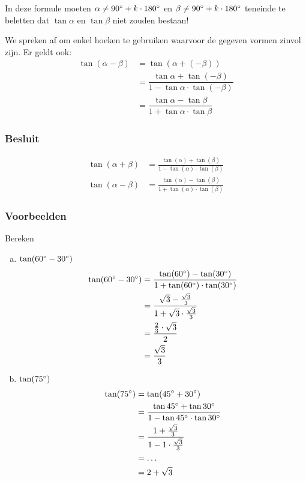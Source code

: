 \documentclass[a4paper,12pt]{article}
\begin{document}
In deze formule moeten $\alpha\neq 90^\circ + k\cdot 180^\circ$ en $\beta \neq 90^\circ + k\cdot 180^\circ$ teneinde te beletten dat $\tan\alpha$ en $\tan\beta$ niet zouden bestaan!

We spreken af om enkel hoeken te gebruiken waarvoor de gegeven vormen zinvol zijn. Er geldt ook:
\begin{align*}
  \tan(\alpha - \beta) &= \tan(\alpha + (-\beta))\\
                       &= \dfrac{\tan\alpha + \tan(-\beta)}{1-\tan\alpha\cdot\tan(-\beta)}\\
                       &= \dfrac{\tan\alpha - \tan\beta}{1+\tan\alpha\cdot\tan\beta}
\end{align*}

\subsubsection*{Besluit}
\begin{align*}
  \tan(\alpha + \beta)&=\frac{\tan(\alpha)+\tan(\beta)}{1-\tan(\alpha)\cdot\tan(\beta)}\\
  \tan(\alpha - \beta)&=\frac{\tan(\alpha)-\tan(\beta)}{1+\tan(\alpha)\cdot\tan(\beta)}
\end{align*}
\textbf{\[
\]}

\pagebreak
\subsubsection*{Voorbeelden}
Bereken
\begin{enumerate}[(a)]
  \item $\tan(60^\circ - 30^\circ)$
  \vspace*{-0.5cm}
  \begin{align*}
    \tan(60^\circ - 30^\circ)&=\dfrac{\tan(60^\circ)-\tan(30^\circ)}{1+\tan(60^\circ)\cdot\tan(30^\circ)}\\
                               &=\dfrac{\sqrt{3}-\frac{\sqrt{3}}{3}}{1+\sqrt{3}\cdot\frac{\sqrt{3}}{3}}\\
                               &=\dfrac{\frac{2}{3}\cdot\sqrt{3}}{2}\\
                               &=\dfrac{\sqrt{3}}{3}
  \end{align*}
  \item $\tan(75^\circ)$
  \vspace*{-0.5cm}
  \begin{align*}
    \tan(75^\circ) &= \tan(45^\circ + 30^\circ)\\
                    &= \dfrac{\tan45^\circ+\tan30^\circ}{1-\tan45^\circ\cdot\tan30^\circ}\\
                    &= \dfrac{1+\frac{\sqrt{3}}{3}}{1-1\cdot\frac{\sqrt{3}}{3}}\\
                    &= \ldots\\
                    &= 2+\sqrt{3}
  \end{align*}
\end{enumerate}
\end{document}

